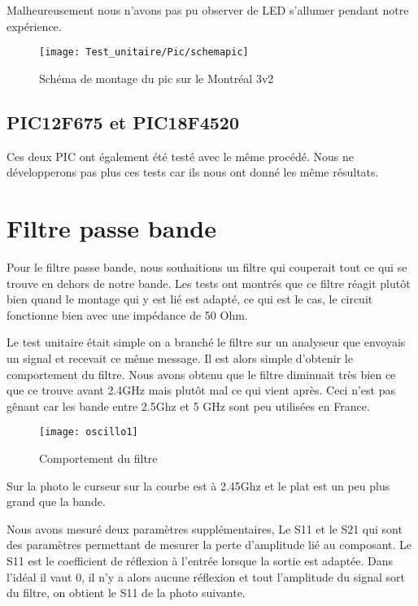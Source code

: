 Malheureusement nous n'avons pas pu observer de LED s'allumer pendant notre expérience.

\begin{figure}[!h]
  \centering
  \texttt{[image: Test\_unitaire/Pic/schemapic]}
  \caption{Schéma de montage du pic sur le Montréal 3v2}
  \label{fig:schemapic}
\end{figure}
\newpage
\subsection{PIC12F675 et PIC18F4520}
\label{sec:picclock}


Ces deux PIC ont également été testé avec le même procédé. Nous ne développerons pas plus ces tests car ils nous ont donné les même résultats.

\section{Filtre passe bande}
\label{sec:passe_bande}


Pour le filtre passe bande, nous souhaitions un filtre qui couperait tout ce qui se trouve en dehors de notre bande. Les tests ont montrés que ce filtre réagit plutôt bien quand le montage qui y est lié est adapté, ce qui est le cas, le circuit fonctionne bien avec une impédance de 50 Ohm.

Le test unitaire était simple on a branché le filtre sur un analyseur que envoyais un signal et recevait ce même message. Il est alors simple d’obtenir le comportement du filtre. Nous avons obtenu que le filtre diminuait très bien ce que ce trouve avant 2.4GHz mais plutôt mal ce qui vient après. Ceci n’est pas gênant car les bande entre 2.5Ghz et 5 GHz sont peu utilisées en France. 

\begin{figure}[h]
  \centering
  \texttt{[image: oscillo1]}
  \caption{Comportement du filtre}
  \label{fig:comportement}
\end{figure}

Sur la photo le curseur sur la courbe est à 2.45Ghz et le plat est un peu plus grand que la bande.

Nous avons mesuré deux paramètres supplémentaires, Le S11 et le S21 qui sont des paramètres permettant de mesurer la perte d’amplitude lié au composant. Le S11 est le coefficient de réflexion à l'entrée lorsque la sortie est adaptée. Dans l’idéal il vaut 0, il n’y a alors aucune réflexion et tout l’amplitude du signal sort du filtre, on obtient le S11 de la photo suivante.

